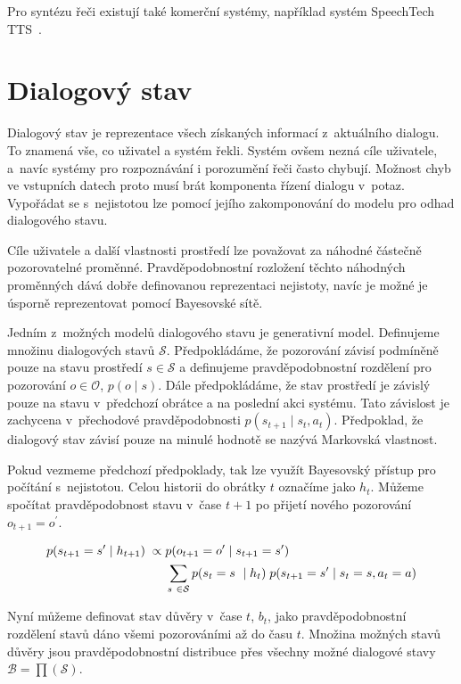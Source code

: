 Pro syntézu řeči existují také komerční systémy, například systém SpeechTech TTS~\cite{speechtech}.

\section{Dialogový stav}

Dialogový stav je reprezentace všech získaných informací z~aktuálního dialogu.
To znamená vše, co uživatel a systém řekli.
Systém ovšem nezná cíle uživatele, a~navíc systémy pro rozpoznávání i porozumění řeči často chybují.
Možnost chyb ve vstupních datech proto musí brát komponenta řízení dialogu v~potaz.
Vypořádat se s~nejistotou lze pomocí jejího zakomponování do modelu pro odhad dialogového stavu.

Cíle uživatele a další vlastnosti prostředí lze považovat za náhodné částečně pozorovatelné proměnné.
Pravděpodobnostní rozložení těchto náhodných proměnných dává dobře definovanou reprezentaci nejistoty, navíc je možné je úsporně reprezentovat pomocí Bayesovské sítě.

Jedním z~možných modelů dialogového stavu je generativní model.
Definujeme množinu dialogových stavů $\mathcal{S}$.
Předpokládáme, že pozorování závisí podmíněně pouze na stavu prostředí $s \in \mathcal{S}$ a definujeme pravděpodobnostní rozdělení pro pozorování $o \in \mathcal{O}$, $p(o \mid s)$.
Dále předpokládáme, že stav prostředí je závislý pouze na stavu v~předchozí obrátce a na poslední akci systému.
Tato závislost je zachycena v~přechodové pravděpodobnosti $p(s_{t+1} \mid s_t, a_t)$.
Předpoklad, že dialogový stav závisí pouze na minulé hodnotě se nazývá Markovská vlastnost.

Pokud vezmeme předchozí předpoklady, tak lze využít Bayesovský přístup pro počítání s~nejistotou.
Celou historii do obrátky $t$ označíme jako $h_t$.
Můžeme spočítat pravděpodobnost stavu v~čase $t+1$ po přijetí nového pozorování $o_{t+1} = o^\prime$.

\begin{align}
\small
p(s_{t+1} = s^\prime \mid h_{t+1}) \; \propto &\; 
    p(o_{t+1} = o^\prime \mid s_{t+1} = s^\prime)
\label{eq:beliefupdate} \\
    &\;\sum_{s~\in \mathcal{S}}
        p(s_t = s~\mid h_t)\;
        p(s_{t+1} = s^\prime \mid s_t = s, a_t = a) \nonumber
\end{align}

Nyní můžeme definovat stav důvěry v~čase $t$, $b_t$, jako pravděpodobnostní rozdělení stavů dáno všemi pozorováními až do času $t$.
Množina možných stavů důvěry jsou pravděpodobnostní distribuce přes všechny možné dialogové stavy $\mathcal{B} = \prod(\mathcal{S})$.

